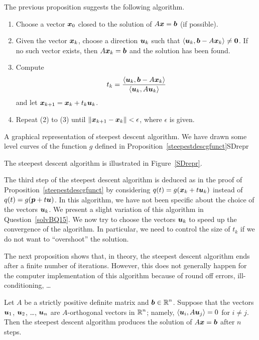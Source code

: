 The previous proposition suggests the following algorithm.

\begin{algo} \label{SteepDescAlgo}
\begin{enumerate}
\item Choose a vector $\bm{x}_{0}$ closed to the solution of
$A \bm{x} = \bm{b}$ (if possible).
\item Given the vector $\bm{x}_{k}$, choose a direction $\bm{u}_k$
such that $\left\langle{\bm{u}_k} , {\bm{b} - A\bm{x}_k}\right\rangle \neq \bm{0}$.  If no
such vector exists, then $A\bm{x}_k = \bm{b}$ and the
solution has been found.
\item Compute
\[
t_k = \frac{\left\langle{\bm{u}_k} , {\bm{b} -
    A\bm{x}_k}\right\rangle}{\left\langle{\bm{u}_k} , {A\bm{u}_k}\right\rangle}
\]
and let
$\bm{x}_{k+1} = \bm{x}_k + t_k \bm{u}_k$.
\item Repeat (2) to (3) until
$\| \bm{x}_{k+1} - \bm{x}_{k} \| < \epsilon$,
where $\epsilon$ is given.
\end{enumerate}
\end{algo}

{A graphical representation of steepest descent algorithm.  We have
drawn some level curves of the function $g$ defined in
Proposition~\ref{steepestdescgfunct}}{SDrepr}

The steepest descent algorithm is illustrated in Figure~\ref{SDrepr}.

The third step of the steepest descent algorithm is deduced as in the
proof of Proposition~\ref{steepestdescgfunct} by considering
$q(t) = g(\bm{x}_k + t \bm{u}_k)$ instead of
$q(t) = g(\bm{p} + t \bm{u})$.  In this algorithm, we
have not been specific about the choice of the vectors $\bm{u}_k$.
We present a slight variation of this algorithm in
Question~\ref{solvBQ15}.  We now try to choose the vectors $\bm{u}_k$
to speed up the convergence of the algorithm.  In particular, we need
to control the size of $t_k$ if we do not want to ``overshoot'' the
solution.

The next proposition shows that, in theory, the steepest descent algorithm ends
after a finite number of iterations.  However, this does not generally
happen for the computer implementation of this algorithm because of
round off errors, ill-conditioning, \ldots

\begin{prop}
Let $A$ be a strictly positive definite matrix and
$\displaystyle \bm{b}\in\mathbb{R}^n$.
Suppose that the vectors
$\bm{u}_1$, $\bm{u}_2$, \ldots , $\bm{u}_n$ are $A$-orthogonal
vectors in $\displaystyle \mathbb{R}^n$; namely, $\left\langle{\bm{u}_i} , {A\bm{u}_j}\right\rangle = 0$ for
$i\neq j$.  Then the steepest descent algorithm produces the solution
of $A\bm{x}=\bm{b}$ after $n$ steps.
\end{prop}

